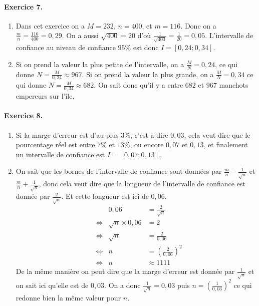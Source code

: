 \documentclass[11pt]{article}
\begin{document}
\paragraph{Exercice 7.}
\begin{enumerate}
  \item Dans cet exercice on a $M=232$, $n=400$, et $m=116$. Donc on a
    $\frac{m}{n} = \frac{116}{400}=0,29$. On a aussi $\sqrt{400} = 20$ d'où
    $\frac{1}{\sqrt{400}} = \frac{1}{20}=0,05$. L'intervalle de confiance au
    niveau de confiance $95\%$ est donc $I=\left[ 0,24;0,34 \right]$.
  \item Si on prend la valeur la plus petite de l'intervalle, on a
    $\frac{M}{N} = 0,24$, ce qui donne $N=\frac{M}{0,24}\approx967$. Si on prend
    la valeur la plus grande, on a $\frac{M}{N} = 0,34$ ce qui donne
    $N=\frac{M}{0,34}\approx682$. On sait donc qu'il y a entre $682$ et $967$
    manchots empereurs sur l'île.
\end{enumerate}

\paragraph{Exercice 8.}
\begin{enumerate}
  \item Si la marge d'erreur est d'au plus $3\%$, c'est-à-dire $0,03$, cela veut
    dire que le pourcentage réel est entre $7\%$ et $13\%$, ou encore $0,07$ et
    $0,13$, et
    finalement un intervalle de confiance est $I=\left[ 0,07 ; 0,13 \right]$.
  \item On sait que les bornes de l'intervalle de confiance sont données par
    $\frac{m}{n}-\frac{1}{\sqrt n}$ et 
    $\frac{m}{n}+\frac{1}{\sqrt n}$, donc cela veut dire que la longueur de
    l'intervalle de confiance est donnée par $\frac{2}{\sqrt n}$. Et cette
    longueur est ici de $0,06$.
    \begin{align*}
     & & 0,06 &= \frac{2}{\sqrt n} \\
      &\Leftrightarrow& \sqrt n \times 0,06 &= 2 \\
      &\Leftrightarrow& \sqrt n &= \frac{2}{0,06} \\
      &\Leftrightarrow& n &= \left( \frac{2}{0,06} \right)^2 \\
      &\Leftrightarrow& n &\approx 1111 
    \end{align*}
    De la même manière on peut dire que la marge d'erreur est donnée par
    $\frac{1}{\sqrt n}$ et on sait ici qu'elle est de $0,03$. On a donc
    $\frac{1}{\sqrt n}=0,03$ puis $n=(\frac{1}{0,03})^2$ ce qui redonne bien la même valeur pour $n$.
\end{enumerate}
\end{document}
